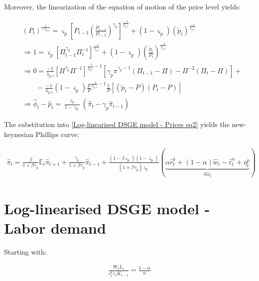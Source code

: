\documentclass{pracamgr}
\numberwithin{equation}{section}
\begin{document}
Moreover, the linearization of the equation of motion of the price level yields:

\begin{align}
& \left( P_{t} \right)^{\frac{1}{-\lambda_{p,t}}} =  \varsigma_{p} \left[ P_{t-1}\left(\frac{P_{t-1}}{P_{t-2}}\right)^{\gamma_{p}} \right]^{\frac{-1}{\lambda_{p,t}}} + (1-\varsigma_{p}) \left(\widetilde{p}_{t} \right)^{\frac{-1}{\lambda_{p,t}}} \nonumber \\
& \Rightarrow 1 = \varsigma_{p} \left[ \Pi_{t-1}^{\gamma_{p}} \Pi_{t}^{-1} \right]^{\frac{-1}{\lambda_{p,t}}} + (1-\varsigma_{p}) \left(\frac{\widetilde{p}_{t}}{P_{t}} \right)^{\frac{-1}{\lambda_{p,t}}} \nonumber \\
& \Rightarrow 0 = \frac{-1}{\lambda_{p,t}} \left[ \Pi^{\gamma_{p}} \Pi^{-1} \right]^{\frac{-1}{\lambda_{p,t}}-1} \left[\gamma_{p} \pi^{\gamma_{p}-1} \left(\Pi_{t-1} - \Pi \right) - \Pi^{-2} \left(\Pi_{t} - \Pi \right)
\right] + \nonumber \\
& \qquad - \frac{-1}{\lambda_{p,t}} (1-\varsigma_{p}) \frac{P}{P}^{\frac{-1}{\lambda_{p,t}}-1} \frac{1}{P} \left[ \left(\widetilde{p}_{t} - P \right) \left( P_{t} - P \right) \right]  \nonumber \\
& \Rightarrow \hat{\phi}_{t} - \hat{p}_{t} = \frac{\varsigma_{p}}{1-\varsigma_{p}} \left( \hat{\pi}_{t} - \gamma_{p} \hat{\pi}_{t-1} \right)
\end{align}

The substitution into \ref{Log-linearised DSGE model - Prices eq2} yields the new-keynesian Phillips curve:

\begin{align}
\hat{\pi}_{t} = \frac{\beta}{1+\beta \gamma_{p}} \mathbb{E}_{t} \hat{\pi}_{t+1} + \frac{\gamma_{p}}{1+\beta \gamma_{p}} \hat{\pi}_{t-1} + \frac{\left( 1 - \beta \varsigma_{p} \right) \left( 1 - \varsigma_{p} \right)}{\left(1+\beta \gamma_{p} \right) \varsigma_{p}} \left( \underbrace{\alpha \hat{r}^{k}_{t} + (1-\alpha)\hat{w}_{t} - \hat{\varepsilon}_{t}^{a} + \eta_{t}^{p} }_{\hat{mc}_{t}} \right)
\end{align}

\section*{Log-linearised DSGE model - Labor demand}

Starting with:

\begin{align}
\frac{W_{t} L_{t}}{r_{t}^{k}z_{t}K_{t-1}} = \frac{1-\alpha}{\alpha}
\end{align}
\end{document}
